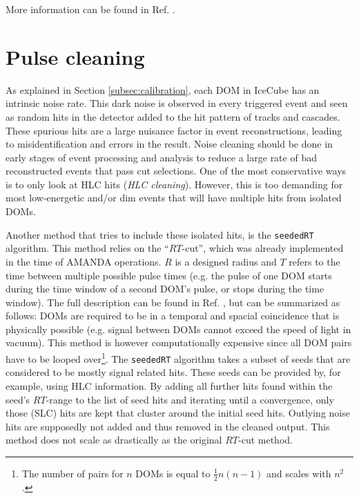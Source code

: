 More information can be found in Ref. \cite{Neunhoffer:2004ha}.

\section{Pulse cleaning}
\label{sec:pulsecleaning}
As explained in Section \ref{subsec:calibration}, each DOM in IceCube has an intrinsic noise rate. This dark noise is observed in every triggered event and seen as random hits in the detector added to the hit pattern of tracks and cascades. These spurious hits are a large nuisance factor in event reconstructions, leading to misidentification and errors in the result. Noise cleaning should be done in early stages of event processing and analysis to reduce a large rate of bad reconstructed events that pass cut selections. One of the most conservative ways is to only look at HLC hits (\textit{HLC cleaning}). However, this is too demanding for most low-energetic and/or dim events that will have multiple hits from isolated DOMs. 

Another method that tries to include these isolated hits, is the \texttt{seededRT}  algorithm. This method relies on the ``$RT$-cut'', which was already implemented in the time of AMANDA operations. $R$ is a designed radius and $T$ refers to the time between multiple possible pulse times (e.g. the pulse of one DOM starts during the time window of a second DOM's pulse, or stops during the time window). The full description can be found in Ref. \cite{RTcutwiki}, but can be summarized as follows: DOMs are required to be in a temporal and spacial coincidence that is physically possible (e.g. signal between DOMs cannot exceed the speed of light in vacuum). This method is however computationally expensive since all DOM pairs have to be looped over\footnote{The number of pairs for $n$ DOMs is equal to $\frac{1}{2}n(n-1)$ and scales with $n^2$.}. The \texttt{seededRT} algorithm takes a subset of seeds that are considered to be mostly signal related hits. These seeds can be provided by, for example, using HLC information. By adding all further hits found within the seed's $RT$-range to the list of seed hits and iterating until a convergence, only those (SLC) hits are kept that cluster around the initial seed hits. Outlying noise hits are supposedly not added and thus removed in the cleaned output. This method does not scale as drastically as the original $RT$-cut method.


